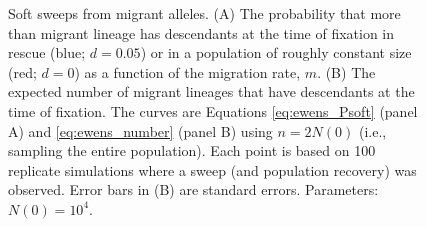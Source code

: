 \documentclass[]{article}
\begin{document}
\begin{figure}[htb]
\centering
{}
\caption{
Soft sweeps from migrant alleles.
(A) The probability that more than migrant lineage has descendants at the time of fixation in rescue (blue; $d=0.05$) or in a population of roughly constant size (red; $d=0$) as a function of the migration rate, $m$.
(B) The expected number of migrant lineages that have descendants at the time of fixation.
The curves are Equations \ref{eq:ewens_Psoft} (panel A) and \ref{eq:ewens_number} (panel B) using $n=2N(0)$ (i.e., sampling the entire population).
Each point is based on 100 replicate simulations where a sweep (and population recovery) was observed.
Error bars in (B) are standard errors.
Parameters: $N(0)=10^4$.
}%
\label{fig:PsoftMIG}
\end{figure}

\end{document}

